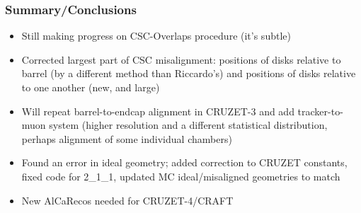 \documentclass[compress]{beamer}
\begin{document}
\begin{frame}
\frametitle{Summary/Conclusions}
\small

\begin{itemize}\setlength{\itemsep}{0.3 cm}
\item Still making progress on CSC-Overlaps procedure (it's subtle)
\item Corrected largest part of CSC misalignment: positions of
  disks relative to barrel (by a different method than Riccardo's)
  and positions of disks relative to one another (new, and large)
\item Will repeat barrel-to-endcap alignment in CRUZET-3 and add
  tracker-to-muon system (higher resolution and a different
  statistical distribution, perhaps alignment of some individual chambers)
\item Found an error in ideal geometry; added correction to CRUZET
  constants, fixed code for 2\_1\_1, updated MC ideal/misaligned
  geometries to match
\item New AlCaRecos needed for CRUZET-4/CRAFT
\end{itemize}

\label{numpages}
\end{frame}
\end{document}
